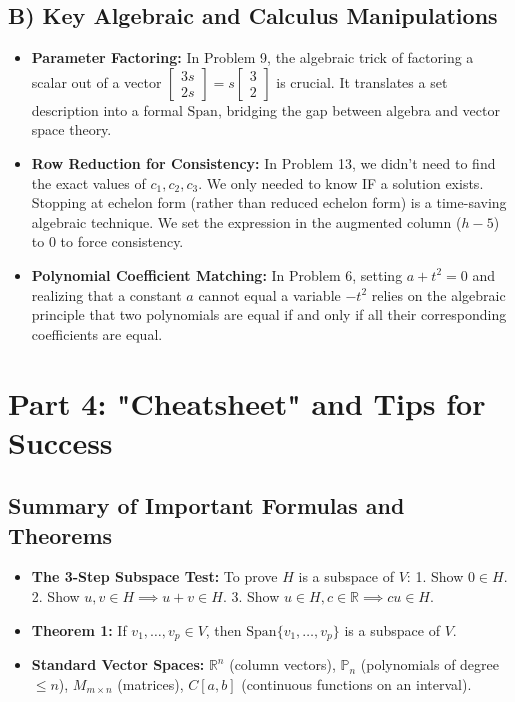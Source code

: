 \documentclass[12pt]{article}
\begin{document}
\subsection{B) Key Algebraic and Calculus Manipulations}
\begin{itemize}
    \item \textbf{Parameter Factoring:} In Problem 9, the algebraic trick of factoring a scalar out of a vector $\begin{bmatrix} 3s \\ 2s \end{bmatrix} = s \begin{bmatrix} 3 \\ 2 \end{bmatrix}$ is crucial. It translates a set description into a formal $\text{Span}$, bridging the gap between algebra and vector space theory.
    \item \textbf{Row Reduction for Consistency:} In Problem 13, we didn't need to find the exact values of $c_1, c_2, c_3$. We only needed to know IF a solution exists. Stopping at echelon form (rather than reduced echelon form) is a time-saving algebraic technique. We set the expression in the augmented column ($h-5$) to $0$ to force consistency.
    \item \textbf{Polynomial Coefficient Matching:} In Problem 6, setting $a + t^2 = 0$ and realizing that a constant $a$ cannot equal a variable $-t^2$ relies on the algebraic principle that two polynomials are equal if and only if all their corresponding coefficients are equal.
\end{itemize}

\newpage

\section{Part 4: "Cheatsheet" and Tips for Success}

\subsection{Summary of Important Formulas and Theorems}
\begin{itemize}
    \item \textbf{The 3-Step Subspace Test:} To prove $H$ is a subspace of $V$:
        1. Show $0 \in H$.
        2. Show $u, v \in H \implies u+v \in H$.
        3. Show $u \in H, c \in \mathbb{R} \implies cu \in H$.
    \item \textbf{Theorem 1:} If $v_1, \dots, v_p \in V$, then $\text{Span}\{v_1, \dots, v_p\}$ is a subspace of $V$.
    \item \textbf{Standard Vector Spaces:} $\mathbb{R}^n$ (column vectors), $\mathbb{P}_n$ (polynomials of degree $\le n$), $M_{m \times n}$ (matrices), $C[a,b]$ (continuous functions on an interval).
\end{itemize}
\end{document}
